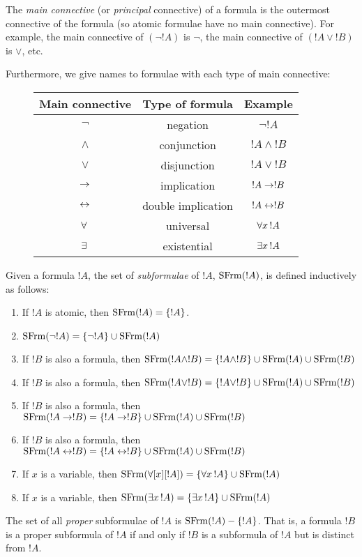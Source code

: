 \documentclass[open-logic-section]{subfiles}
\begin{document}
\begin{defn}
The \emph{main connective} (or \emph{principal} connective) of a
formula is the outermost connective of the formula (so atomic formulae
have no main connective). For example, the main connective of $(\lnot
!A)$ is $\lnot$, the main connective of $(!A \lor !B)$ is $\lor$, etc.

Furthermore, we give names to formulae with each type of main connective:

\begin{figure}[!h]
\centering
\begin{tabular}{| c | c | c |}
\hline
Main connective & Type of formula & Example\\
\hline
$\lnot$ & negation & $\lnot !A$ \\
$\land$ & conjunction & $!A \land !B$ \\
$\lor$ & disjunction & $!A \lor !B$ \\
$\to$ & implication & $!A \to !B$ \\
$\leftrightarrow$ & double implication & $!A \leftrightarrow !B$ \\
$\lforall[][]$ & universal & $\lforall[x][!A]$ \\
$\lexists[][]$ & existential & $\lexists[x][!A]$\\ \hline
\end{tabular}
\end{figure}

\end{defn}

\begin{defn}[Subformula]
Given a formula $!A$, the set of \emph{subformulae} of $!A$,
$\mathrm{SFrm}({!A})$, is defined inductively as follows:
\begin{enumerate}
\item If $!A$ is atomic, then $\mathrm{SFrm}({!A}) = \{!A\}$.
\item $\mathrm{SFrm}({\lnot !A}) = \{\lnot !A\} \cup \mathrm{SFrm}({!A})$
\item If $!B$ is also a formula, then $\mathrm{SFrm}({!A \land !B}) = \{!A
  \land !B\} \cup \mathrm{SFrm}({!A}) \cup \mathrm{SFrm}({!B})$
\item If $!B$ is also a formula, then $\mathrm{SFrm}({!A \lor !B}) = \{!A \lor
  !B\} \cup \mathrm{SFrm}({!A}) \cup \mathrm{SFrm}({!B})$
\item If $!B$ is also a formula, then $\mathrm{SFrm}({!A \to !B}) = \{!A \to
  !B\} \cup \mathrm{SFrm}({!A}) \cup \mathrm{SFrm}({!B})$
\item If $!B$ is also a formula, then $\mathrm{SFrm}({!A \leftrightarrow !B}) = \{!A
  \leftrightarrow !B\} \cup \mathrm{SFrm}({!A}) \cup \mathrm{SFrm}({!B})$
\item If $x$ is a variable, then $\SubFrm{\forall[x][!A]} =
  \{\lforall[x][!A]\} \cup \SubFrm{!A}$
\item If $x$ is a variable, then $\SubFrm{\lexists[x][!A]} =
  \{\lexists[x][!A]\} \cup \SubFrm{!A}$
\end{enumerate}
The set of all \emph{proper} subformulae of $!A$ is $\mathrm{SFrm}({!A}) -
\{!A\}$. That is, a formula $!B$ is a proper subformula of $!A$ if and
only if $!B$ is a subformula of $!A$ but is distinct from $!A$.
\end{defn}
\end{document}
